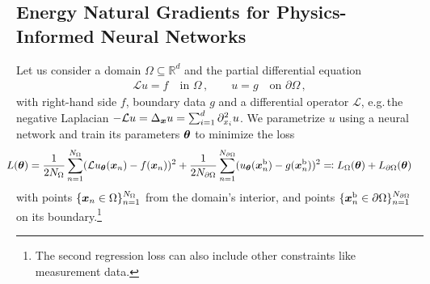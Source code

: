 \subsection{Energy Natural Gradients for Physics-Informed Neural Networks}\label{subsec:engd}
Let us consider a domain $\Omega\subseteq\mathbb R^d$ and the partial differential equation
\begin{align*}
  \mathcal{L} u = f \quad \text{in }\Omega\,,
                   \qquad
  u = g \quad \text{on }\partial\Omega\,,
\end{align*}
with right-hand side $f$, boundary data $g$ and a differential operator
$\mathcal{L}$, e.g.\,the negative Laplacian $-\mathcal{L} u = \Delta_{{\bm{x}}} u = \sum_{i=1}^d \partial_{{x}_i}^2 u$.
We parametrize $u$ using a neural network and train its parameters ${\bm{\theta}}$ to minimize the loss
\begin{align}\label{eq:pinn-loss}
  \!\!\!\!\!\!
  L({\bm{\theta}})
  &=
    \frac{1}{2N_\Omega} \sum_{n=1}^{N_\Omega} (\mathcal{L} u_{\bm{\theta}}({\bm{x}}_n) - f({\bm{x}}_n))^2
    +
    \frac{1}{2N_{\partial\Omega}}\sum_{n=1}^{N_{\partial\Omega}} ( u_{\bm{\theta}}({\bm{x}}^\text{b}_n) - g({\bm{x}}^\text{b}_n))^2
    \eqqcolon
    L_\Omega({\bm{\theta}}) + L_{\partial\Omega}({\bm{\theta}})
\end{align}
with points $\{{\bm{x}}_n \in \Omega \}_{n=1}^{N_\Omega}$ from the domain's interior, and points $\{{\bm{x}}^\text{b}_n \in \partial\Omega \}_{n=1}^{N_{\partial\Omega}}$ on its boundary.\footnote{The second regression loss can also include other constraints like measurement data.}

